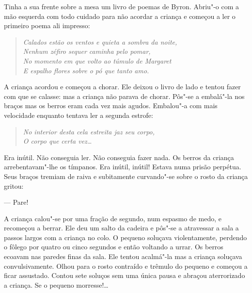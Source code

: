 Tinha a sua frente sobre a mesa um livro de poemas de Byron.  Abriu"-o com a mão esquerda com todo cuidado para não acordar a criança e começou a ler o primeiro
poema ali impresso:

\begin{verse}\itshape
Calados estão os ventos e quieta a sombra da \qb{}noite,\\
Nenhum zéfiro sequer caminha pelo pomar,\\
No momento em que volto ao túmulo de Margaret\\
E espalho flores sobre o pó que tanto amo.
\end{verse}


A criança acordou e começou a chorar.  Ele deixou o livro de lado e tentou
fazer com que se calasse: mas a criança não parava de chorar.  Pôs"-se a
embalá"-la nos braços mas os berros eram cada vez mais agudos.  Embalou"-a com
mais velocidade enquanto tentava ler a segunda estrofe:

\begin{verse}\itshape
No interior desta cela estreita jaz seu corpo,\\
O corpo que certa vez\ldots{}
\end{verse}

Era inútil.  Não conseguia ler.  Não conseguia fazer nada.  Os berros da
criança arrebentavam"-lhe os tímpanos.  Era inútil, inútil!  Estava numa prisão
perpétua.  Seus braços tremiam de raiva e subitamente curvando"-se sobre o rosto
da criança gritou:

--- Pare!

A criança calou"-se por uma fração de segundo, num espasmo de medo, e recomeçou
a berrar.  Ele deu um salto da cadeira e pôs"-se a atravessar a sala a passos
largos com a criança no colo.  O pequeno soluçava violentamente, perdendo o
fôlego por quatro ou cinco segundos e então voltando a urrar.  Os berros
ecoavam nas paredes finas da sala.  Ele tentou acalmá"-la mas a criança soluçava
convulsivamente.  Olhou para o rosto contraído e trêmulo do pequeno e começou a
ficar assustado.  Contou sete soluços sem uma única pausa e abraçou
aterrorizado a criança.  Se o pequeno morresse!\ldots{}

